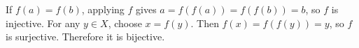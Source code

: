 If $f(a)=f(b)$, applying $f$ gives $a=f(f(a))=f(f(b))=b$, so $f$ is injective. For any $y\in X$, choose $x=f(y)$. Then $f(x)=f(f(y))=y$, so $f$ is surjective. Therefore it is bijective.
